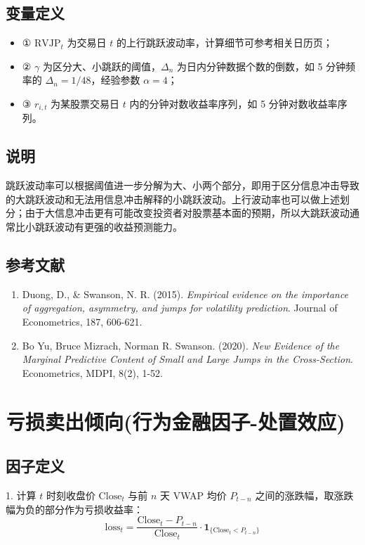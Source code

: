 \documentclass{article}
\begin{document}
\subsection{变量定义}
\begin{itemize}
    \item ① \( \mathrm{RVJP}_t \) 为交易日 \( t \) 的上行跳跃波动率，计算细节可参考相关日历页；
    \item ② \( \gamma \) 为区分大、小跳跃的阈值，\( \Delta_n \) 为日内分钟数据个数的倒数，如 5 分钟频率的 \( \Delta_n = 1/48 \)，经验参数 \( \alpha = 4 \)；
    \item ③ \( r_{i,t} \) 为某股票交易日 \( t \) 内的分钟对数收益率序列，如 5 分钟对数收益率序列。
\end{itemize}

\subsection{说明}
跳跃波动率可以根据阈值进一步分解为大、小两个部分，即用于区分信息冲击导致的大跳跃波动和无法用信息冲击解释的小跳跃波动。上行波动率也可以做上述划分；由于大信息冲击更有可能改变投资者对股票基本面的预期，所以大跳跃波动通常比小跳跃波动有更强的收益预测能力。

\subsection{参考文献}
\begin{enumerate}
    \item Duong, D., \& Swanson, N. R. (2015). \textit{Empirical evidence on the importance of aggregation, asymmetry, and jumps for volatility prediction}. Journal of Econometrics, 187, 606-621.
    \item Bo Yu, Bruce Mizrach, Norman R. Swanson. (2020). \textit{New Evidence of the Marginal Predictive Content of Small and Large Jumps in the Cross-Section}. Econometrics, MDPI, 8(2), 1-52.
\end{enumerate}

\section{亏损卖出倾向(行为金融因子-处置效应)}

\subsection{因子定义}

1. 计算 \( t \) 时刻收盘价 \( \mathrm{Close}_t \) 与前 \( n \) 天 VWAP 均价 \( P_{t-n} \) 之间的涨跌幅，取涨跌幅为负的部分作为亏损收益率：
\begin{equation}
    \mathrm{loss}_t = \frac{\mathrm{Close}_t - P_{t-n}}{\mathrm{Close}_t} \cdot \mathbf{1}_{\{\mathrm{Close}_t < P_{t-n}\}}
\end{equation}
\end{document}
